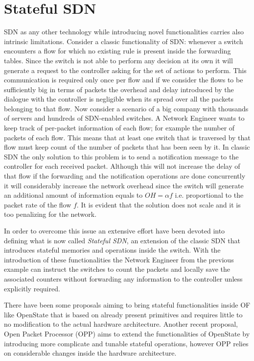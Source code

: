 \section{Stateful SDN}
\label{chap:intro/ssdn}
SDN as any other technology while introducing novel functionalities carries also intrinsic limitations. Consider a classic functionality of SDN: whenever a switch encounters a flow for which no existing rule is present inside the forwarding tables. Since the switch is not able to perform any decision at its own it will generate a request to the controller asking for the set of actions to perform. This communication is required only once per flow and if we consider the flows to be sufficiently big in terms of packets the overhead and delay introduced by the dialogue with the controller is negligible when its spread over all the packets belonging to that flow. Now consider a scenario of a big company with thousands of servers and hundreds of SDN-enabled switches. A Network Engineer wants to keep track of per-packet information of each flow; for example the number of packets of each flow. This means that at least one switch that is traversed by that flow must keep count of the number of packets that has been seen by it. In classic SDN the only solution to this problem is to send a notification message to the controller for each received packet. Although this will not increase the delay of that flow if the forwarding and the notification operations are done concurrently it will considerably increase the network overhead since the switch will generate an additional amount of information equals to $OH=\alpha f$ i.e. proportional to the packet rate of the flow $f$. It is evident that the solution does not scale and it is too penalizing for the network.

In order to overcome this issue an extensive effort have been devoted into defining what is now called \textit{Stateful SDN}, an extension of the classic SDN that introduces stateful memories and operations inside the switch. With the introduction of these functionalities the Network Engineer from the previous example can instruct the switches to count the packets and locally save the associated counters without forwarding any information to the controller unless explicitly required.

There have been some proposals aiming to bring stateful functionalities inside OF like OpenState \cite{bianchi2014openstate} that is based on already present primitives and requires little to no modification to the actual hardware architecture. Another recent proposal, Open Packet Processor (OPP) \cite{bianchi2016open} aims to extend the functionalities of OpenState by introducing more complicate and tunable stateful operations, however OPP relies on considerable changes inside the hardware architecture.

